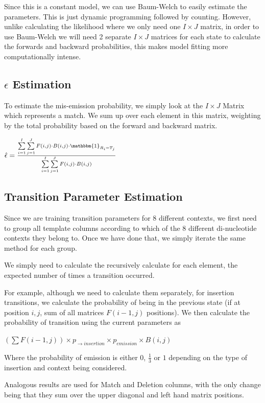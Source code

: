 \documentclass[paper=a4, fontsize=11pt]{scrartcl}
\numberwithin{equation}{section}		%
\numberwithin{figure}{section}			%
\numberwithin{table}{section}				%
\begin{document}
Since this is a constant model, we can use Baum-Welch to easily estimate the parameters.  This is just dynamic programming followed by counting.  However, unlike calculating the likelihood where we only need one $I \times J$ matrix, in order to use Baum-Welch we will need 2 separate $I \times J$ matrices for each state to calculate the forwards and backward probabilities, this makes model fitting more computationally intense.

\subsection{$\epsilon$ Estimation}

To estimate the mis-emission probability, we simply look at the $I \times J$ Matrix which represents a match.  We sum up over each element in this matrix, weighting by the total probability based on the forward and backward matrix. 
\begin{center}
$\hat{ \epsilon} = \frac{\sum\limits_{i=1}^I \sum\limits_{j=1}^J F(i,j) \cdot B(i,j) \cdot \mathbbm{1}_{R_{i} = T_{j}} }  {\sum\limits_{i=1}^I \sum\limits_{j=1}^J F(i,j) \cdot B(i,j)}$
\end{center}

\subsection{Transition Parameter Estimation}

Since we are training transition parameters for 8 different contexts, we first need to group all template columns according to which of the 8 different di-nucleotide contexts they belong to.  Once we have done that, we simply iterate the same method for each group.

We simply need to calculate the recursively calculate for each element, the expected number of times a transition occurred.

For example, although we need to calculate them separately, for insertion transitions, we calculate the probability of being in the previous state (if at position $i,j$, sum of all matrices $F(i-1, j)$ positions).  We then calculate the probability of transition using the current parameters as 

\begin{center}
$(\sum F(i-1, j) )\times p_{\rightarrow insertion} \times p_{emission}  \times B(i, j) $
\end{center}

Where the probability of emission is either $0$, $\frac{1}{3}$ or $1$ depending on the type of insertion and context being considered.


Analogous results are used for Match and Deletion columns, with the only change being that they sum over the upper diagonal and left hand matrix positions. 

 
\end{document}
